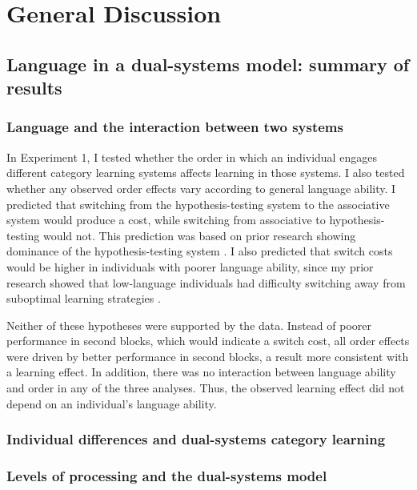\documentclass[../dissertation.tex]{subfiles}
\begin{document}
\section{General Discussion}

\subsection{Language in a dual-systems model: summary of results}
\subsubsection{Language and the interaction between two systems}
In Experiment 1, I tested whether the order in which an individual engages different category learning systems affects learning in those systems. I also tested whether any observed order effects vary according to general language ability. I predicted that switching from the hypothesis-testing system to the associative system would produce a cost, while switching from associative to hypothesis-testing would not. This prediction was based on prior research showing dominance of the hypothesis-testing system \citep{Erickson2008, Ashby2010}. I also predicted that switch costs would be higher in individuals with poorer language ability, since my prior research showed that low-language individuals had difficulty switching away from suboptimal learning strategies \citep{Ryherd2019}. \par 
Neither of these hypotheses were supported by the data. Instead of poorer performance in second blocks, which would indicate a switch cost, all order effects were driven by better performance in second blocks, a result more consistent with a learning effect. In addition, there was no interaction between language ability and order in any of the three analyses. Thus, the observed learning effect did not depend on an individual's language ability.

\subsubsection{Individual differences and dual-systems category learning}

\subsubsection{Levels of processing and the dual-systems model}
\end{document}
